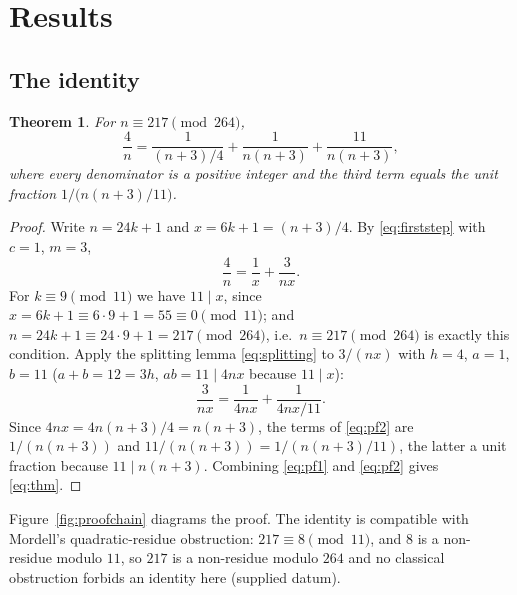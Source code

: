 \documentclass[11pt,a4paper]{article}
\newtheorem{theorem}{Theorem}
\theoremstyle{definition}
\begin{document}
\section{Results}

\subsection{The identity}

\begin{theorem}
  \label{thm:main}
  For $n \equiv 217 \pmod{264}$,
  \begin{equation}
    \label{eq:thm}
    \frac{4}{n} = \frac{1}{(n+3)/4} + \frac{1}{n(n+3)}
                 + \frac{11}{n(n+3)},
  \end{equation}
  where every denominator is a positive integer and the third term equals
  the unit fraction $1/\bigl(n(n+3)/11\bigr)$.
\end{theorem}

\begin{proof}
  Write $n = 24k+1$ and $x = 6k+1 = (n+3)/4$. By \eqref{eq:firststep} with
  $c=1$, $m=3$,
  \begin{equation}
    \label{eq:pf1}
    \frac{4}{n} = \frac{1}{x} + \frac{3}{nx}.
  \end{equation}
  For $k \equiv 9 \pmod{11}$ we have $11 \mid x$, since
  $x = 6k+1 \equiv 6\cdot 9 + 1 = 55 \equiv 0 \pmod{11}$; and
  $n = 24k+1 \equiv 24\cdot 9 + 1 = 217 \pmod{264}$, i.e.\ $n \equiv 217
  \pmod{264}$ is exactly this condition. Apply the splitting lemma
  \eqref{eq:splitting} to $3/(nx)$ with $h=4$, $a=1$, $b=11$
  ($a+b = 12 = 3h$, $ab = 11 \mid 4nx$ because $11 \mid x$):
  \begin{equation}
    \label{eq:pf2}
    \frac{3}{nx} = \frac{1}{4nx} + \frac{1}{4nx/11}.
  \end{equation}
  Since $4nx = 4n(n+3)/4 = n(n+3)$, the terms of \eqref{eq:pf2} are
  $1/(n(n+3))$ and $11/(n(n+3)) = 1/(n(n+3)/11)$, the latter a unit
  fraction because $11 \mid n(n+3)$. Combining \eqref{eq:pf1} and
  \eqref{eq:pf2} gives \eqref{eq:thm}. \qedhere
\end{proof}

Figure~\ref{fig:proofchain} diagrams the proof. The identity is compatible
with Mordell's quadratic-residue obstruction: $217 \equiv 8 \pmod{11}$, and
$8$ is a non-residue modulo $11$, so $217$ is a non-residue modulo $264$
and no classical obstruction forbids an identity here (supplied datum).
\end{document}
